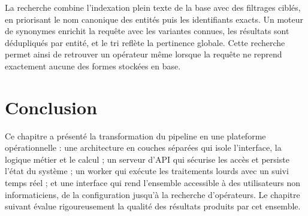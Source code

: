 \noindent La recherche combine l'indexation plein texte de la base avec des filtrages ciblés, en priorisant le nom canonique des entités puis les identifiants exacts. Un moteur de synonymes enrichit la requête avec les variantes connues, les résultats sont dédupliqués par entité, et le tri reflète la pertinence globale. Cette recherche permet ainsi de retrouver un opérateur même lorsque la requête ne reprend exactement aucune des formes stockées en base.

\section*{Conclusion}

Ce chapitre a présenté la transformation du pipeline en une plateforme opérationnelle : une architecture en couches séparées qui isole l'interface, la logique métier et le calcul ; un serveur d'API qui sécurise les accès et persiste l'état du système ; un worker qui exécute les traitements lourds avec un suivi temps réel ; et une interface qui rend l'ensemble accessible à des utilisateurs non informaticiens, de la configuration jusqu'à la recherche d'opérateurs. Le chapitre suivant évalue rigoureusement la qualité des résultats produits par cet ensemble.
